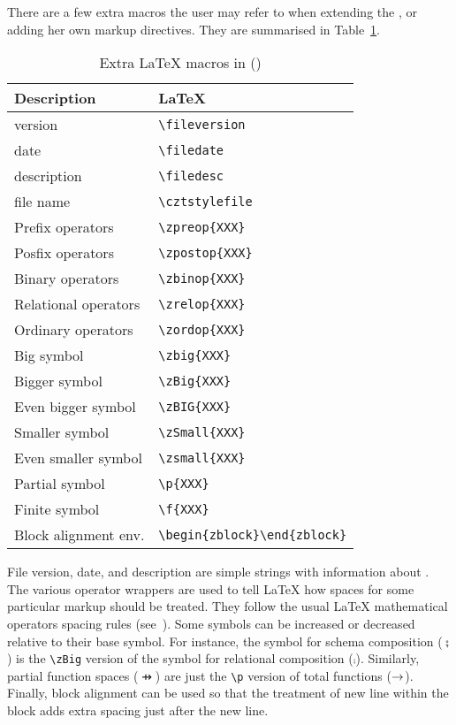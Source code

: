 \documentclass{article}
\newcommand{\smallcaption}[1]{{\small (#1)}}
\begin{document}
There are a few extra macros the user may refer to when extending the
\cztstylefile, or adding her own markup directives. They are summarised
in Table~\ref{tbl:cztsty-extra}.
%
\begin{table}[ht]
\centering
\begin{tabular}{|l|l|}
    \hline
    \textbf{Description} & \textbf{\LaTeX} \\
    \hline
    \cztstylefile{} version       & \verb|\fileversion|      \\
    \hline
    \cztstylefile{} date          & \verb|\filedate|           \\
    \hline
    \cztstylefile{} description   & \verb|\filedesc|  \\
    \hline
    \cztstylefile{} file name     & \verb|\cztstylefile| \\
    \hline
    Prefix operators               & \verb|\zpreop{XXX}|         \\
    \hline
    Posfix operators        & \verb|\zpostop{XXX}|        \\
    \hline
    Binary operators               & \verb|\zbinop{XXX}|     \\
    \hline
    Relational operators       & \verb|\zrelop{XXX}|  \\
    \hline
    Ordinary operators    & \verb|\zordop{XXX}|  \\
    \hline
    Big symbol            & \verb|\zbig{XXX}| \\
    \hline
    Bigger symbol         & \verb|\zBig{XXX}| \\
    \hline
    Even bigger symbol    & \verb|\zBIG{XXX}| \\
    \hline
    Smaller symbol        & \verb|\zSmall{XXX}| \\
    \hline
    Even smaller symbol   & \verb|\zsmall{XXX}| \\
    \hline
    Partial symbol        & \verb|\p{XXX}| \\
    \hline
    Finite symbol         & \verb|\f{XXX}| \\
    \hline
    Block alignment env.  & {\small \verb|\begin{zblock}\end{zblock}|} \\
    \hline
\end{tabular}
\caption{Extra \LaTeX{} macros in \smallcaption{\cztstylefile}}\label{tbl:cztsty-extra}
\end{table}
%
File version, date, and description are simple strings with
information about \cztstylefile. The various operator wrappers
are used to tell \LaTeX{} how spaces for some particular markup
should be treated. They follow the usual \LaTeX{} mathematical
operators spacing rules (see~\cite[p.~525, Table~8.7]{latexcomp}).
Some symbols can be increased or decreased relative to their base symbol.
For instance, the symbol for schema composition ($\semi$) is the \verb|\zBig|
version of the symbol for relational composition ($\comp$).
Similarly, partial function spaces ($\pfun$) are just the \verb|\p|
version of total functions ($\fun$). Finally, block alignment can be
used so that the treatment of new line within the block adds extra
spacing just after the new line.
\end{document}
